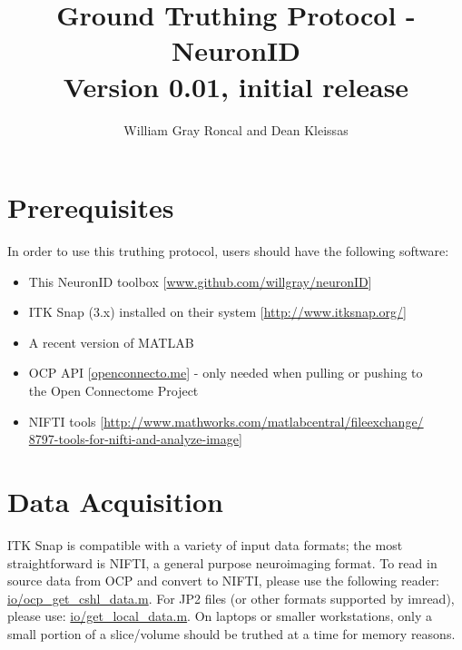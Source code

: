 \documentclass[11pt]{amsart}
\title{Ground Truthing Protocol - NeuronID \\
 Version 0.01, initial release}
\author{William Gray Roncal and Dean Kleissas}
\begin{document}
\maketitle

\section{Prerequisites}

In order to use this truthing protocol, users should have the following software:
\begin{itemize}
\item{This NeuronID toolbox [\url{www.github.com/willgray/neuronID}]}
\item{ITK Snap (3.x) installed on their system [\url{http://www.itksnap.org/}]}
\item{A recent version of MATLAB}
\item{OCP API [\url{openconnecto.me}] - only needed when pulling or pushing to \\ the Open Connectome Project}
\item{NIFTI tools  [\url{http://www.mathworks.com/matlabcentral/fileexchange/} \\ \url{8797-tools-for-nifti-and-analyze-image]}}

\end{itemize}

\section{Data Acquisition}

\noindent ITK Snap is compatible with a variety of input data formats; the most straightforward is NIFTI, a general purpose neuroimaging format.  To read in source data from OCP and convert to NIFTI, please use the following reader: \url{io/ocp_get_cshl_data.m}.  For JP2 files (or other formats supported by imread), please use: \url{io/get_local_data.m}.  On laptops or smaller workstations, only a small portion of a slice/volume should be truthed at a time for memory reasons.  
\end{document}
